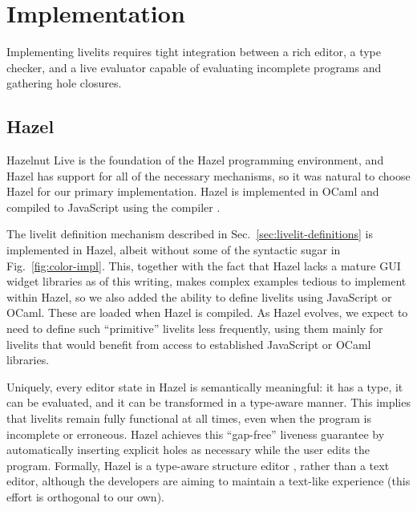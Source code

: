 \section{Implementation}\label{sec:implementation}
Implementing livelits requires tight integration between a rich editor, 
a type checker, and a live evaluator 
capable of evaluating incomplete programs and gathering hole closures.

\subsection{Hazel}
Hazelnut Live is the foundation of the Hazel programming environment, 
and Hazel has support for all of the necessary mechanisms, so 
it was natural to choose Hazel for our primary implementation.
Hazel is implemented in OCaml and compiled to JavaScript using the  compiler \cite{DBLP:conf/aplas/RadanneVB16}.

The livelit definition mechanism described in Sec.~\ref{sec:livelit-definitions}
is implemented in Hazel, albeit without some of the syntactic sugar in Fig.~\ref{fig:color-impl}.
This, together with the fact that Hazel lacks a mature GUI widget libraries as of this writing, 
makes complex examples tedious to implement within Hazel, so we also 
added the ability to define livelits using JavaScript or OCaml. These are loaded when 
Hazel is compiled. As Hazel evolves, we expect to need to define such ``primitive'' livelits less 
frequently, using them mainly for livelits that would benefit from access to established JavaScript 
or OCaml libraries.

Uniquely, every editor state in Hazel is 
semantically meaningful: it has a type, it can be evaluated, and it can be transformed 
in a type-aware manner. This implies that livelits remain fully functional at all times, 
even when the program is incomplete or erroneous. Hazel achieves this ``gap-free'' liveness guarantee by automatically inserting explicit holes as necessary 
while the user edits 
the program. Formally, Hazel is a type-aware structure editor \cite{Hazelnut}, rather than a text editor, 
although the developers are aiming to maintain a text-like experience (this effort is orthogonal to our own). 




